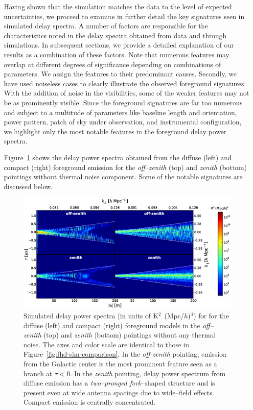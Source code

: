 \documentclass[preprint2,iop,numberedappendix,twocolappendix,appendixfloats]{emulateapj}
\begin{document}
Having shown that the simulation matches the data to the level of expected uncertainties, we proceed to examine in further detail the key signatures seen in simulated delay spectra. A number of factors are responsible for the characteristics noted in the delay spectra obtained from data and through simulations. In subsequent sections, we provide a detailed explanation of our results as a combination of these factors. Note that numerous features may overlap at different degrees of significance depending on combinations of parameters. We assign the features to their predominant causes. Secondly, we have used noiseless cases to clearly illustrate the observed foreground signatures. With the addition of noise in the visibilities, some of the weaker features may not be as prominently visible. Since the foreground signatures are far too numerous and subject to a multitude of parameters like baseline length and orientation, power pattern, patch of sky under observation, and instrumental configuration, we highlight only the most notable features in the foreground delay power spectra.

Figure~\ref{fig:noiseless-dsm-csm-delay-spectrum} shows the delay power spectra obtained from the diffuse (left) and compact (right) foreground emission for the {\it off--zenith} (top) and {\it zenith} (bottom) pointings without thermal noise component. Some of the notable signatures are discussed below.

\begin{figure}[htb]
\centering
\includegraphics[width=\linewidth]{figure7.eps}
\caption{Simulated delay power spectra (in units of K$^2$~(Mpc/$h$)$^3$) for for the diffuse (left) and compact (right) foreground models in the {\it off--zenith} (top) and {\it zenith} (bottom) pointings without any thermal noise. The axes and color scale are identical to those in Figure~\ref{fig:fhd-sim-comparison}. In the {\it off-zenith} pointing, emission from the Galactic center is the most prominent feature seen as a branch at $\tau<0$. In the {\it zenith} pointing, delay power spectrum from diffuse emission has a {\it two--pronged fork}--shaped structure and is present even at wide antenna spacings due to wide--field effects. Compact emission is centrally concentrated. \label{fig:noiseless-dsm-csm-delay-spectrum}}
\end{figure}
\end{document}
